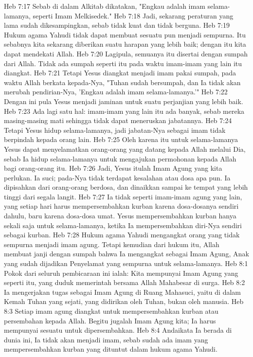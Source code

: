 Heb 7:17  Sebab di dalam Alkitab dikatakan, "Engkau adalah imam selama-lamanya, seperti Imam Melkisedek."
Heb 7:18  Jadi, sekarang peraturan yang lama sudah dikesampingkan, sebab tidak kuat dan tidak berguna.
Heb 7:19  Hukum agama Yahudi tidak dapat membuat sesuatu pun menjadi sempurna. Itu sebabnya kita sekarang diberikan suatu harapan yang lebih baik; dengan itu kita dapat mendekati Allah.
Heb 7:20  Lagipula, semuanya itu disertai dengan sumpah dari Allah. Tidak ada sumpah seperti itu pada waktu imam-imam yang lain itu diangkat.
Heb 7:21  Tetapi Yesus diangkat menjadi imam pakai sumpah, pada waktu Allah berkata kepada-Nya, "Tuhan sudah bersumpah, dan Ia tidak akan merubah pendirian-Nya, 'Engkau adalah imam selama-lamanya.'"
Heb 7:22  Dengan ini pula Yesus menjadi jaminan untuk suatu perjanjian yang lebih baik.
Heb 7:23  Ada lagi satu hal: imam-imam yang lain itu ada banyak, sebab mereka masing-masing mati sehingga tidak dapat meneruskan jabatannya.
Heb 7:24  Tetapi Yesus hidup selama-lamanya, jadi jabatan-Nya sebagai imam tidak berpindah kepada orang lain.
Heb 7:25  Oleh karena itu untuk selama-lamanya Yesus dapat menyelamatkan orang-orang yang datang kepada Allah melalui Dia, sebab Ia hidup selama-lamanya untuk mengajukan permohonan kepada Allah bagi orang-orang itu.
Heb 7:26  Jadi, Yesus itulah Imam Agung yang kita perlukan. Ia suci; pada-Nya tidak terdapat kesalahan atau dosa apa pun. Ia dipisahkan dari orang-orang berdosa, dan dinaikkan sampai ke tempat yang lebih tinggi dari segala langit.
Heb 7:27  Ia tidak seperti imam-imam agung yang lain, yang setiap hari harus mempersembahkan kurban karena dosa-dosanya sendiri dahulu, baru karena dosa-dosa umat. Yesus mempersembahkan kurban hanya sekali saja untuk selama-lamanya, ketika Ia mempersembahkan diri-Nya sendiri sebagai kurban.
Heb 7:28  Hukum agama Yahudi mengangkat orang yang tidak sempurna menjadi imam agung. Tetapi kemudian dari hukum itu, Allah membuat janji dengan sumpah bahwa Ia mengangkat sebagai Imam Agung, Anak yang sudah dijadikan Penyelamat yang sempurna untuk selama-lamanya.
Heb 8:1  Pokok dari seluruh pembicaraan ini ialah: Kita mempunyai Imam Agung yang seperti itu, yang duduk memerintah bersama Allah Mahabesar di surga.
Heb 8:2  Ia mengerjakan tugas sebagai Imam Agung di Ruang Mahasuci, yaitu di dalam Kemah Tuhan yang sejati, yang didirikan oleh Tuhan, bukan oleh manusia.
Heb 8:3  Setiap imam agung diangkat untuk mempersembahkan kurban atau persembahan kepada Allah. Begitu jugalah Imam Agung kita; Ia harus mempunyai sesuatu untuk dipersembahkan.
Heb 8:4  Andaikata Ia berada di dunia ini, Ia tidak akan menjadi imam, sebab sudah ada imam yang mempersembahkan kurban yang dituntut dalam hukum agama Yahudi.
